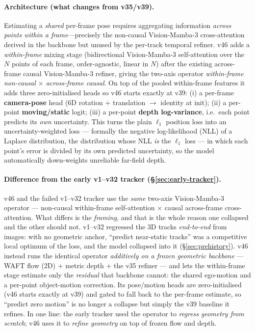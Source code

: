 \documentclass[11pt,a4paper]{article}
\begin{document}
\paragraph{Architecture (what changes from v35/v39).}
Estimating a \emph{shared} per-frame pose requires aggregating information \emph{across points within a
frame}---precisely the non-causal Vision-Mamba-3 cross-attention derived in the backbone but unused by the
per-track temporal refiner. v46 adds a \emph{within-frame} mixing stage (bidirectional Vision-Mamba-3
self-attention over the $N$ points of each frame, order-agnostic, linear in $N$) after the existing
across-frame causal Vision-Mamba-3 refiner, giving the two-axis operator \emph{within-frame non-causal $\times$ across-frame
causal}. On top of the pooled within-frame features it adds three zero-initialised heads so v46 starts
exactly at v39: (i) a per-frame \textbf{camera-pose} head ($6$D rotation $+$ translation $\to$ identity at
init); (ii) a per-point \textbf{moving/static} logit; (iii) a per-point \textbf{depth log-variance}, i.e.\ each
point predicts its \emph{own} uncertainty. This turns the plain $\ell_1$ position loss into an
uncertainty-weighted loss --- formally the negative log-likelihood (NLL) of a Laplace distribution, the
distribution whose NLL \emph{is} the $\ell_1$ loss --- in which each point's error is divided by its own
predicted uncertainty, so the model automatically down-weights unreliable far-field depth.

\paragraph{Difference from the early v1--v32 tracker (\S\ref{sec:early-tracker}).}
v46 and the failed v1--v32 tracker use the \emph{same} two-axis Vision-Mamba-3 operator --- non-causal
within-frame self-attention $\times$ causal across-frame cross-attention. What differs is the \emph{framing},
and that is the whole reason one collapsed and the other should not. v1--v32 regressed the 3D tracks
\emph{end-to-end} from images: with no geometric anchor, ``predict near-static tracks'' was a competitive
local optimum of the loss, and the model collapsed into it (\S\ref{sec:prehistory}). v46 instead runs the
identical operator \emph{additively on a frozen geometric backbone} --- WAFT flow (2D) $+$ metric depth $+$
the v35 refiner --- and lets the within-frame stage estimate only the \emph{residual} that backbone cannot:
the shared ego-motion and a per-point object-motion correction. Its pose/motion heads are zero-initialised
(v46 starts exactly at v39) and gated to fall back to the per-frame estimate, so ``predict zero motion'' is
no longer a collapse but simply the v39 baseline it refines. In one line: the early tracker used the operator
to \emph{regress geometry from scratch}; v46 uses it to \emph{refine geometry} on top of frozen flow and
depth.
\end{document}
